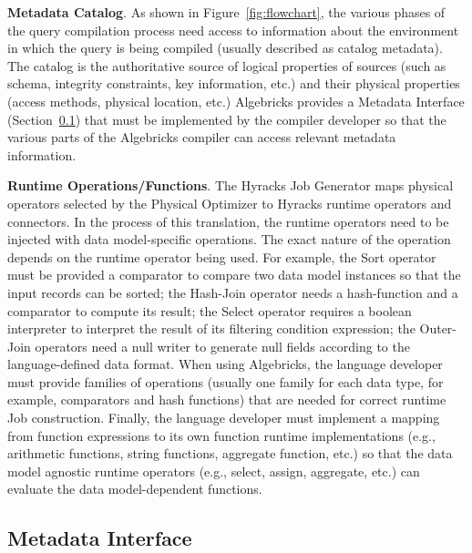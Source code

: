 \textbf{Metadata Catalog}. As shown in Figure~\ref{fig:flowchart}, the various phases of the query compilation process need access to information about the
environment in which the query is being compiled (usually described as catalog metadata). 
The catalog is the authoritative source of logical properties of sources (such as schema,
integrity constraints, key information, etc.) and their physical properties (access methods, physical location, etc.) Algebricks
provides a Metadata Interface (Section~\ref{subsec:metadata}) that must be implemented by the compiler developer so that the various parts of the Algebricks
compiler can access relevant metadata information. 

\textbf{Runtime Operations/Functions}. 
The Hyracks Job Generator maps physical operators selected by the Physical Optimizer to Hyracks runtime operators and connectors. 
In the process of this translation, the runtime operators need to be injected with data model-specific operations. 
The exact nature of the operation depends on the runtime operator being used. 
For example, the Sort operator  must be provided a comparator to compare two data model instances so that the input records can be sorted; the  Hash-Join operator needs a hash-function and a comparator to compute its result; the Select operator requires a boolean interpreter to interpret the result of its filtering condition expression; the Outer-Join operators need a null writer to generate null fields according to the language-defined data format. 
When using Algebricks, the language developer must provide families of operations (usually one family for each data type, for example, comparators and hash functions) that are needed for correct runtime Job construction.
Finally, the language developer must implement a mapping from function expressions to its own function runtime implementations (e.g., arithmetic functions, string functions, aggregate function, etc.) so that the data model agnostic runtime operators (e.g., select, assign, aggregate, etc.) can evaluate the data model-dependent functions.



\subsection{Metadata Interface}\label{subsec:metadata}

